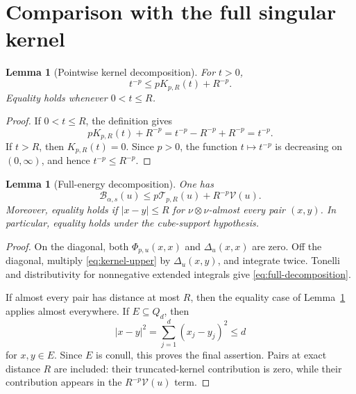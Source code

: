 \documentclass[11pt]{article}
\newtheorem{lemma}[theorem]{Lemma}
\theoremstyle{remark}
\newcommand{\Tenergy}{\mathcal T}
\newcommand{\Benergy}{\mathcal B}
\newcommand{\Venergy}{\mathcal V}
\newcommand{\Cube}{Q_d}
\begin{document}
\section{Comparison with the full singular kernel}

\begin{lemma}[Pointwise kernel decomposition]                              \label{lem:kernel-decomposition}
For \(t>0\),
\begin{equation}
  t^{-p}
  \leq
  pK_{p,R}(t)+R^{-p}.                                                      \label{eq:kernel-upper}
\end{equation}
Equality holds whenever \(0<t\leq R\).
\end{lemma}

\begin{proof}
If \(0<t\leq R\), the definition gives
\[
  pK_{p,R}(t)+R^{-p}
  =
  t^{-p}-R^{-p}+R^{-p}
  =
  t^{-p}.
\]
If \(t>R\), then \(K_{p,R}(t)=0\).  Since \(p>0\), the function
\(t\mapsto t^{-p}\) is decreasing on \((0,\infty)\), and hence
\(t^{-p}\leq R^{-p}\).
\end{proof}

\begin{lemma}[Full-energy decomposition]                                  \label{lem:full-decomposition}
One has
\begin{equation}
  \Benergy_{\alpha,s}(u)
  \leq
  p\Tenergy_{p,R}(u)
  +
  R^{-p}\Venergy(u).                                                       \label{eq:full-decomposition}
\end{equation}
Moreover, equality holds if
\(\lvert x-y\rvert\leq R\) for \(\nu\otimes\nu\)-almost every pair
\((x,y)\).  In particular, equality holds under the cube-support
hypothesis.
\end{lemma}

\begin{proof}
On the diagonal, both \(\Phi_{p,u}(x,x)\) and
\(\Delta_u(x,x)\) are zero.  Off the diagonal, multiply
\eqref{eq:kernel-upper} by \(\Delta_u(x,y)\), and integrate twice.  Tonelli
and distributivity for nonnegative extended integrals give
\eqref{eq:full-decomposition}.

If almost every pair has distance at most \(R\), then the equality case of
Lemma~\ref{lem:kernel-decomposition} applies almost everywhere.  If
\(E\subseteq\Cube\), then
\[
  \lvert x-y\rvert^2
  =
  \sum_{j=1}^d(x_j-y_j)^2
  \leq d
\]
for \(x,y\in E\).  Since \(E\) is conull, this proves the final assertion.
Pairs at exact distance \(R\) are included: their truncated-kernel
contribution is zero, while their contribution appears in the
\(R^{-p}\Venergy(u)\) term.
\end{proof}
\end{document}
